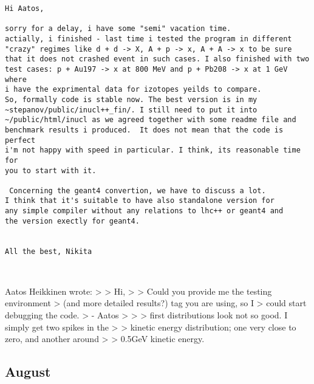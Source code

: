 \begin{verbatim}
Hi Aatos,
 
sorry for a delay, i have some "semi" vacation time.
actially, i finished - last time i tested the program in different
"crazy" regimes like d + d -> X, A + p -> x, A + A -> x to be sure
that it does not crashed event in such cases. I also finished with two
test cases: p + Au197 -> x at 800 MeV and p + Pb208 -> x at 1 GeV where
i have the exprimental data for izotopes yeilds to compare.
So, formally code is stable now. The best version is in my
~stepanov/public/inucl++_fin/. I still need to put it into
~/public/html/inucl as we agreed together with some readme file and
benchmark results i produced.  It does not mean that the code is perfect
i'm not happy with speed in particular. I think, its reasonable time for
you to start with it.
 
 Concerning the geant4 convertion, we have to discuss a lot.
I think that it's suitable to have also standalone version for
any simple compiler without any relations to lhc++ or geant4 and
the version exectly for geant4.
 
 
All the best, Nikita

                                                     

\end{verbatim}
\normalsize
 
 
Aatos Heikkinen wrote: > > Hi, > > Could you provide me the testing
environment > (and more detailed results?) tag you are using, so I >
could start debugging the code.  > - Aatos > > > first distributions
look not so good. I simply get two spikes in the > > kinetic energy
distribution; one very close to zero, and another around > > 0.5GeV
kinetic energy.
                                                                         

\subsection{August}


